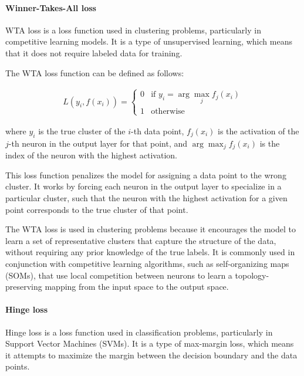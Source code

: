 \paragraph{Winner-Takes-All loss}
\label{par:3_WTA_loss}

\acf{WTA} loss is a loss function used in clustering problems, particularly in competitive learning models. It is a type of unsupervised learning, which means that it does not require labeled data for training.

The \ac{WTA} loss function can be defined as follows:

\begin{equation}
\begin{split}
	L(y_i, f(x_i)) = \begin{cases}
		0 & \text{if } y_i = \arg\max_j f_j(x_i) \\
		1 & \text{otherwise} \
	\end{cases}
\end{split}
\end{equation}

where $y_i$ is the true cluster of the $i$-th data point, $f_j(x_i)$ is the activation of the $j$-th neuron in the output layer for that point, and $\arg\max_j f_j(x_i)$ is the index of the neuron with the highest activation.

This loss function penalizes the model for assigning a data point to the wrong cluster. It works by forcing each neuron in the output layer to specialize in a particular cluster, such that the neuron with the highest activation for a given point corresponds to the true cluster of that point.

The \ac{WTA} loss is used in clustering problems because it encourages the model to learn a set of representative clusters that capture the structure of the data, without requiring any prior knowledge of the true labels. It is commonly used in conjunction with competitive learning algorithms, such as self-organizing maps (SOMs), that use local competition between neurons to learn a topology-preserving mapping from the input space to the output space.

\paragraph{Hinge loss}
\label{par:3_hinge_loss}

Hinge loss is a loss function used in classification problems, particularly in Support Vector Machines (SVMs). It is a type of max-margin loss, which means it attempts to maximize the margin between the decision boundary and the data points.

